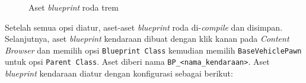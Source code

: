 \begin{figure}[!ht]
    \centering
    \hfill
    \caption{Aset \textit{blueprint} roda trem}
    \label{fig:tram-wheel-blueprints}
\end{figure}

Setelah semua opsi diatur, aset-aset \textit{blueprint} roda di-\textit{compile}
dan disimpan. Selanjutnya, aset \textit{blueprint} kendaraan dibuat dengan klik
kanan pada \textit{Content Browser} dan memilih opsi \verb|Blueprint Class|
kemudian memilih \verb|BaseVehiclePawn| untuk opsi \verb|Parent Class|. Aset
diberi nama \verb|BP_<nama_kendaraan>|. Aset \textit{blueprint} kendaraan diatur
dengan konfigurasi sebagai berikut:

